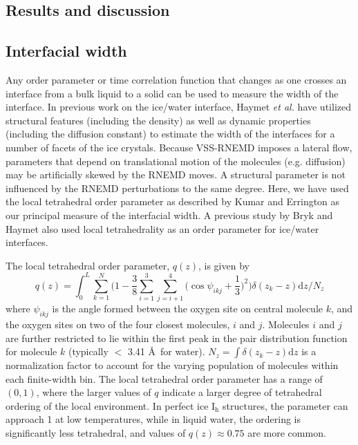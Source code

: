 \documentclass[11pt]{article}
\begin{document}
\begin{doublespace}
\section{Results and discussion}

\subsection{Interfacial width}
Any order parameter or time correlation function that changes as one
crosses an interface from a bulk liquid to a solid can be used to
measure the width of the interface.  In previous work on the ice/water
interface, Haymet {\it et al.}\cite{Bryk02} have utilized structural
features (including the density) as well as dynamic properties
(including the diffusion constant) to estimate the width of the
interfaces for a number of facets of the ice crystals.  Because
VSS-RNEMD imposes a lateral flow, parameters that depend on
translational motion of the molecules (e.g. diffusion) may be
artificially skewed by the RNEMD moves.  A structural parameter is not
influenced by the RNEMD perturbations to the same degree. Here, we
have used the local tetrahedral order parameter as described by
Kumar\cite{Kumar09} and Errington\cite{Errington01} as our principal
measure of the interfacial width.  A previous study by Bryk and Haymet
also used local tetrahedrality as an order parameter for ice/water
interfaces.\cite{Bryk2004b}

The local tetrahedral order parameter, $q(z)$, is given by
\begin{equation}
q(z) = \int_0^L \sum_{k=1}^{N} \Bigg(1 -\frac{3}{8}\sum_{i=1}^{3}
\sum_{j=i+1}^{4} \bigg(\cos\psi_{ikj}+\frac{1}{3}\bigg)^2\Bigg)
\delta(z_{k}-z)\mathrm{d}z \Bigg/ N_z
\label{eq:qz}
\end{equation}
where $\psi_{ikj}$ is the angle formed between the oxygen site on
central molecule $k$, and the oxygen sites on two of the four closest
molecules, $i$ and $j$.  Molecules $i$ and $j$ are further restricted
to lie within the first peak in the pair distribution function for
molecule $k$ (typically $<$ 3.41 \AA\ for water).  $N_z = \int
\delta(z_k - z) \mathrm{d}z$ is a normalization factor to account for
the varying population of molecules within each finite-width bin.  The
local tetrahedral order parameter has a range of $(0,1)$, where the
larger values of $q$ indicate a larger degree of tetrahedral ordering
of the local environment.  In perfect ice I$_\mathrm{h}$ structures,
the parameter can approach 1 at low temperatures, while in liquid
water, the ordering is significantly less tetrahedral, and values of
$q(z) \approx 0.75$ are more common.


\end{doublespace}
\end{document}
